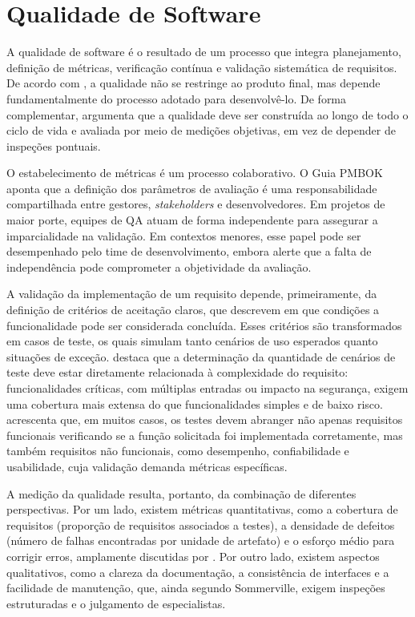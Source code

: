 \section{Qualidade de Software}

A qualidade de software é o resultado de um processo que integra planejamento, definição de métricas, verificação contínua e validação sistemática de requisitos. De acordo com , a qualidade não se restringe ao produto final, mas depende fundamentalmente do processo adotado para desenvolvê-lo. De forma complementar,  argumenta que a qualidade deve ser construída ao longo de todo o ciclo de vida e avaliada por meio de medições objetivas, em vez de depender de inspeções pontuais.


O estabelecimento de métricas é um processo colaborativo. O Guia PMBOK \cite{pmi2008} aponta que a definição dos parâmetros de avaliação é uma responsabilidade compartilhada entre gestores, \textit{stakeholders} e desenvolvedores. Em projetos de maior porte, equipes de QA atuam de forma independente para assegurar a imparcialidade na validação. Em contextos menores, esse papel pode ser desempenhado pelo time de desenvolvimento,  embora  alerte que a falta de independência pode comprometer a objetividade da avaliação.

A validação da implementação de um requisito depende, primeiramente, da definição de critérios de aceitação claros, que descrevem em que condições a funcionalidade pode ser considerada concluída. Esses critérios são transformados em casos de teste, os quais simulam tanto cenários de uso esperados quanto situações de exceção. destaca que a determinação da quantidade de cenários de teste deve estar diretamente relacionada à complexidade do requisito: funcionalidades críticas, com múltiplas entradas ou impacto na segurança, exigem uma cobertura mais extensa do que funcionalidades simples e de baixo risco.  acrescenta que, em muitos casos, os testes devem abranger não apenas requisitos funcionais verificando se a função solicitada foi implementada corretamente, mas também requisitos não funcionais, como desempenho, confiabilidade e usabilidade, cuja validação demanda métricas específicas.

A medição da qualidade resulta, portanto, da combinação de diferentes perspectivas. Por um lado, existem métricas quantitativas, como a cobertura de requisitos (proporção de requisitos associados a testes), a densidade de defeitos (número de falhas encontradas por unidade de artefato) e o esforço médio para corrigir erros, amplamente discutidas por . Por outro lado, existem aspectos qualitativos, como a clareza da documentação, a consistência de interfaces e a facilidade de manutenção, que, ainda segundo Sommerville, exigem inspeções estruturadas e o julgamento de especialistas.

